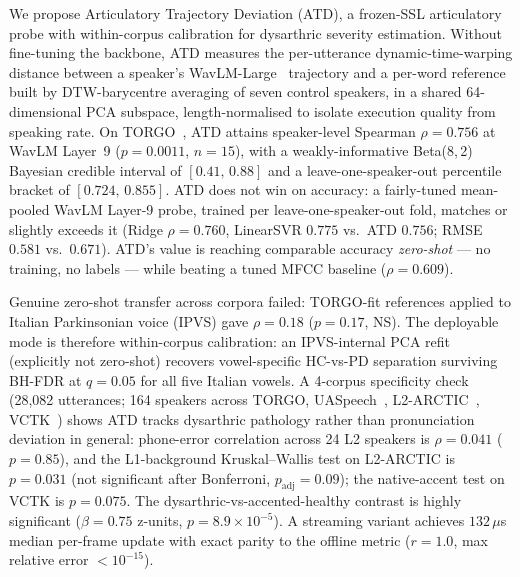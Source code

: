 
We propose Articulatory Trajectory Deviation (ATD), a frozen-SSL
articulatory probe with within-corpus calibration for dysarthric
severity estimation. Without fine-tuning the backbone, ATD measures
the per-utterance dynamic-time-warping distance between a speaker's
WavLM-Large~\cite{Chen2022WavLM} trajectory and a per-word reference
built by DTW-barycentre averaging of seven control speakers, in a
shared 64-dimensional PCA subspace, length-normalised to isolate
execution quality from speaking rate.
On TORGO~\cite{Rudzicz2012TORGO}, ATD attains speaker-level Spearman
$\rho = 0.756$ at WavLM Layer~9 ($p = 0.0011$, $n = 15$), with a
weakly-informative Beta(8,\,2) Bayesian credible interval of
$[0.41,\,0.88]$ and a leave-one-speaker-out percentile bracket of
$[0.724,\,0.855]$. ATD does not win on accuracy: a fairly-tuned
mean-pooled WavLM Layer-9 probe, trained per leave-one-speaker-out fold,
matches or slightly exceeds it (Ridge $\rho = 0.760$, LinearSVR $0.775$
vs.\ ATD $0.756$; RMSE $0.581$ vs.\ $0.671$). ATD's value is reaching
comparable accuracy \emph{zero-shot} --- no training, no labels --- while
beating a tuned MFCC baseline ($\rho = 0.609$).

Genuine zero-shot transfer across corpora failed: TORGO-fit references
applied to Italian Parkinsonian voice (IPVS) gave $\rho = 0.18$
($p = 0.17$, NS). The deployable mode is therefore within-corpus
calibration: an IPVS-internal PCA refit (explicitly not zero-shot)
recovers vowel-specific HC-vs-PD separation surviving BH-FDR at
$q = 0.05$ for all five Italian vowels.
A 4-corpus specificity check (28{,}082 utterances; 164 speakers across
TORGO, UASpeech~\cite{Kim2008UASpeech}, L2-ARCTIC~\cite{Zhao2018L2Arctic}, VCTK~\cite{Veaux2017VCTK})
shows ATD tracks dysarthric pathology rather than pronunciation
deviation in general: phone-error correlation across 24 L2 speakers
is $\rho = 0.041$ ($p = 0.85$), and the L1-background Kruskal--Wallis
test on L2-ARCTIC is $p = 0.031$ (not significant after Bonferroni,
$p_{\text{adj}} = 0.09$); the native-accent test on VCTK is $p = 0.075$.
The dysarthric-vs-accented-healthy contrast
is highly significant ($\hat{\beta} = 0.75$ z-units,
$p = 8.9 \times 10^{-5}$). A streaming variant achieves
$132\,\mu$s median per-frame update with exact parity to the offline
metric ($r = 1.0$, max relative error $<10^{-15}$).
